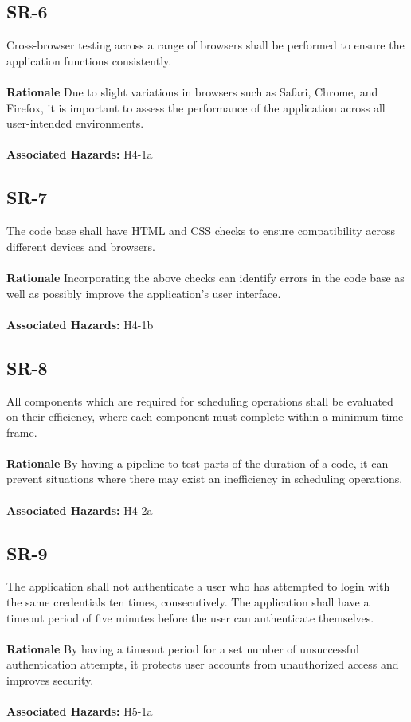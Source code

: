 \documentclass{article}
\begin{document}
\subsection*{SR-6}
Cross-browser testing across a range of browsers shall be performed to ensure the application functions consistently. \\ \\
\textbf{Rationale} Due to slight variations in browsers such as Safari, Chrome, and Firefox, it is important to assess the performance of the application across all user-intended environments. \\ \\
\textbf{Associated Hazards:} H4-1a

\subsection*{SR-7}
The code base shall have HTML and CSS checks to ensure compatibility across different devices and browsers. \\ \\
\textbf{Rationale} Incorporating the above checks can identify errors in the code base as well as possibly improve the application’s user interface. \\ \\
\textbf{Associated Hazards:} H4-1b

\subsection*{SR-8}
All components which are required for scheduling operations shall be evaluated on their efficiency, where each component must complete within a minimum time frame. \\ \\
\textbf{Rationale} By having a pipeline to test parts of the duration of a code, it can prevent situations where there may exist an inefficiency in scheduling operations. \\ \\
\textbf{Associated Hazards:} H4-2a

\subsection*{SR-9}
The application shall not authenticate a user who has attempted to login with the same credentials ten times, consecutively. The application shall have a timeout period of five minutes before the user can authenticate themselves. \\ \\
\textbf{Rationale} By having a timeout period for a set number of unsuccessful authentication attempts, it protects user accounts from unauthorized access and improves security. \\ \\
\textbf{Associated Hazards:} H5-1a
\end{document}
